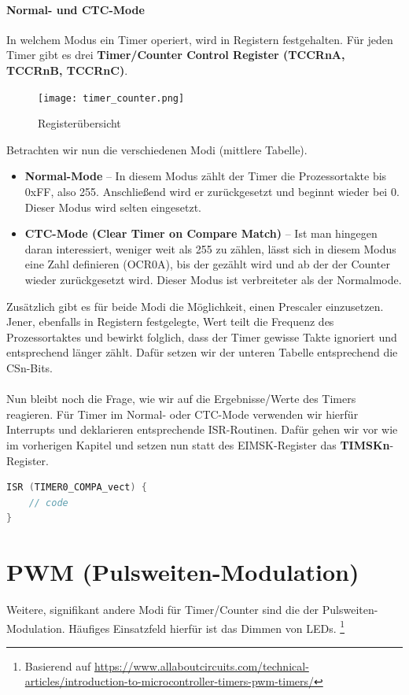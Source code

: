 \documentclass[11pt,a4paper]{scrartcl}
\begin{document}
\paragraph{Normal- und CTC-Mode}
In welchem Modus ein Timer operiert, wird in Registern festgehalten. Für jeden Timer gibt es drei \textbf{Timer/Counter Control Register (TCCRnA, TCCRnB, TCCRnC)}.
\begin{figure}[h!]
\centering
\texttt{[image: timer\_counter.png]}
\caption{Registerübersicht}
\end{figure}
Betrachten wir nun die verschiedenen Modi (mittlere Tabelle).
\begin{itemize}
\item \textbf{Normal-Mode} -- In diesem Modus zählt der Timer die Prozessortakte bis 0xFF, also 255. Anschließend wird er zurückgesetzt und beginnt wieder bei 0. Dieser Modus wird selten eingesetzt.
\item \textbf{CTC-Mode (Clear Timer on Compare Match)} -- Ist man hingegen daran interessiert, weniger weit als 255 zu zählen, lässt sich in diesem Modus eine Zahl definieren (OCR0A), bis der gezählt wird und ab der der Counter wieder zurückgesetzt wird. Dieser Modus ist verbreiteter als der Normalmode.
\end{itemize}
Zusätzlich gibt es für beide Modi die Möglichkeit, einen Prescaler einzusetzen. Jener, ebenfalls in Registern festgelegte, Wert teilt die Frequenz des Prozessortaktes und bewirkt folglich, dass der Timer gewisse Takte ignoriert und entsprechend länger zählt. Dafür setzen wir der unteren Tabelle entsprechend die CSn-Bits. \\\\
Nun bleibt noch die Frage, wie wir auf die Ergebnisse/Werte des Timers reagieren. Für Timer im Normal- oder CTC-Mode verwenden wir hierfür Interrupts und deklarieren entsprechende ISR-Routinen. Dafür gehen wir vor wie im vorherigen Kapitel und setzen nun statt des EIMSK-Register das \textbf{TIMSKn}-Register. 
\begin{lstlisting}[language=C]
ISR (TIMER0_COMPA_vect) {
	// code
}
\end{lstlisting}
\section{PWM (Pulsweiten-Modulation)}
Weitere, signifikant andere Modi für Timer/Counter sind die der Pulsweiten-Modulation. Häufiges Einsatzfeld hierfür ist das Dimmen von LEDs. \footnote{Basierend auf \href{www.allaboutcircuits.com}{https://www.allaboutcircuits.com/technical-articles/introduction-to-microcontroller-timers-pwm-timers/}}
\end{document}
